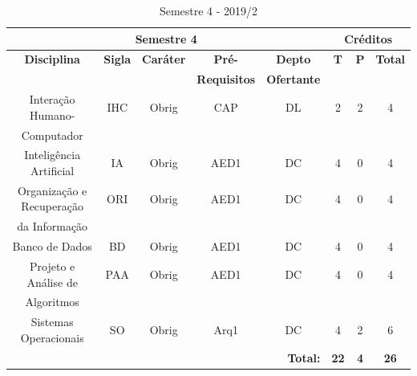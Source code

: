 
\begin{table}[H]
\caption{Semestre 4 - 2019/2}
\centering
\footnotesize
\begin{tabular}{|c|c|c|c|c|c|c|c|} %
\hline
\hline
\multicolumn{5}{|c|}{\textbf{Semestre 4}}  &  \multicolumn{3}{|c|}{\textbf{Créditos}} \\
\hline
\hline
\textbf{Disciplina} & \textbf{Sigla} & \textbf{Caráter} & \textbf{Pré-} & \textbf{Depto} &  \textbf{T}  &  \textbf{P}  & \textbf{Total} \\ 
& & & \textbf{Requisitos}  & \textbf{Ofertante} & & & \\
\hline 

Interação Humano-& IHC & Obrig & CAP & DL & 2 & 2 & 4 \\
Computador & & & & & & & \\
\hline

Inteligência Artificial & IA & Obrig & AED1 & DC & 4 & 0 & 4 \\
\hline

Organização e Recuperação & ORI & Obrig & AED1 & DC  & 4 & 0 & 4 \\
da Informação & & & & & & & \\
\hline

Banco de Dados & BD & Obrig & AED1 & DC  & 4 & 0 & 4 \\
\hline

Projeto e Análise de & PAA & Obrig & AED1 & DC  & 4 & 0 & 4 \\
Algoritmos & & & & & & & \\
\hline

Sistemas Operacionais & SO & Obrig & Arq1 & DC  & 4 & 2 & 6 \\
\hline


\hline
\multicolumn{5}{|r|}{\textbf{Total:}}  &  \textbf{22}  &  \textbf{4}   & \textbf{26} \\ %
\hline
\hline
\end{tabular}
\label{tab:matriz2m}
\end{table}



